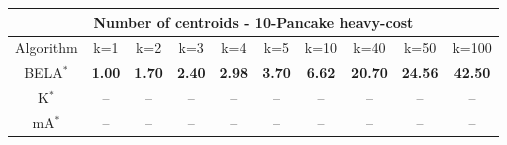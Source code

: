 \begin{tabular}{c|ccccccccc}\toprule
\multicolumn{10}{c}{Number of centroids - 10-Pancake heavy-cost}\\ \midrule
Algorithm & k=1 & k=2 & k=3 & k=4 & k=5 & k=10 & k=40 & k=50 & k=100 \\ \midrule
BELA$^*$ & \textbf{1.00} & \textbf{1.70} & \textbf{2.40} & \textbf{2.98} & \textbf{3.70} & \textbf{6.62} & \textbf{20.70} & \textbf{24.56} & \textbf{42.50} \\
K$^*$ & -- & -- & -- & -- & -- & -- & -- & -- & -- \\
mA$^*$ & -- & -- & -- & -- & -- & -- & -- & -- & -- \\ \bottomrule 
\end{tabular}
